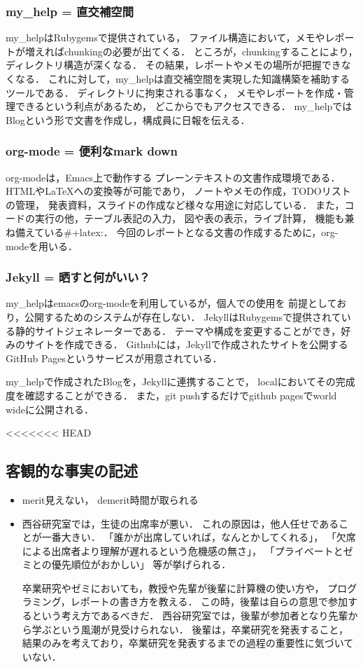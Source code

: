 \documentclass{hissymp}
\begin{document}
\subsubsection{my\_help = 直交補空間}
\label{sec:org47cef5a}
my\_helpはRubygemsで提供されている，
ファイル構造において，メモやレポートが増えればchunkingの必要が出てくる．
ところが，chunkingすることにより，ディレクトリ構造が深くなる．
その結果，レポートやメモの場所が把握できなくなる．
これに対して，my\_helpは直交補空間を実現した知識構築を補助するツールである．
ディレクトリに拘束される事なく，
メモやレポートを作成・管理できるという利点があるため，
どこからでもアクセスできる．
my\_helpではBlogという形で文書を作成し，構成員に日報を伝える．

\subsubsection{org-mode = 便利なmark down}
\label{sec:orgcd09dee}
org-modeは，Emacs上で動作する
プレーンテキストの文書作成環境である．
HTMLや\LaTeX{}への変換等が可能であり，
ノートやメモの作成，TODOリストの管理，
発表資料，スライドの作成など様々な用途に対応している．
また，コードの実行の他，テーブル表記の入力，
図や表の表示，ライブ計算，
機能も兼ね備えている\#+latex:\cite{Org-mode}．
今回のレポートとなる文書の作成するために，org-modeを用いる．

\subsubsection{Jekyll = 晒すと何がいい？}
\label{sec:org7da00eb}
my\_helpはemacsのorg-modeを利用しているが，個人での使用を
前提としており，公開するためのシステムが存在しない．
JekyllはRubygemsで提供されている静的サイトジェネレーターである．
テーマや構成を変更することができ，好みのサイトを作成できる．
Githubには，Jekyllで作成されたサイトを公開する
GitHub Pagesというサービスが用意されている．

my\_helpで作成されたBlogを，Jekyllに連携することで，
localにおいてその完成度を確認することができる．
また，git pushするだけでgithub pagesでworld wideに公開される．


<<<<<<< HEAD

\subsection{客観的な事実の記述}
\label{sec:orgbe32c37}
\begin{itemize}
\item merit見えない， demerit時間が取られる
\item 西谷研究室では，生徒の出席率が悪い．
これの原因は，他人任せであることが一番大きい．
「誰かが出席していれば，なんとかしてくれる」，
「欠席による出席者より理解が遅れるという危機感の無さ」，
「プライベートとゼミとの優先順位がおかしい」
等が挙げられる．

卒業研究やゼミにおいても，教授や先輩が後輩に計算機の使い方や，
プログラミング，レポートの書き方を教える．
この時，後輩は自らの意思で参加するという考え方であるべきだ．
西谷研究室では，後輩が参加者となり先輩から学ぶという風潮が見受けられない．
後輩は，卒業研究を発表すること，
結果のみを考えており，卒業研究を発表するまでの過程の重要性に気づいていない．
\end{itemize}
\end{document}
